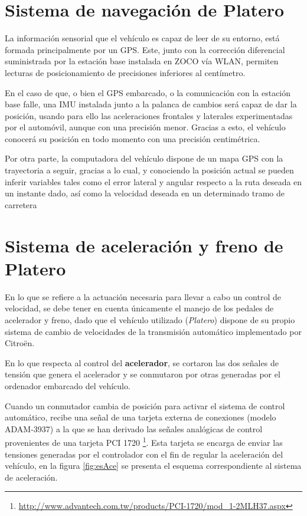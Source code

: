 \section{Sistema de navegación de Platero}
\label{ape:platero}

La información sensorial que el vehículo es capaz de leer de su entorno, está formada principalmente por un \gls{GPS}. Este, junto con la corrección diferencial suministrada por la estación base instalada en \gls{ZOCO} vía {WLAN}, permiten lecturas de posicionamiento de precisiones inferiores al centímetro.

En el caso de que, o bien el \gls{GPS} embarcado, o la comunicación con la estación base falle, una \gls{IMU} instalada junto a la palanca de cambios será capaz de dar la posición, usando para ello las aceleraciones frontales y laterales experimentadas por el automóvil, aunque con una precisión menor. Gracias a esto, el vehículo conocerá su posición en todo momento con una precisión centimétrica.

Por otra parte, la computadora del vehículo dispone de un mapa \gls{GPS} con la trayectoria a seguir, gracias a lo cual, y conociendo la posición actual se pueden inferir variables tales como el error lateral y angular respecto a la ruta deseada en un instante dado, así como la velocidad deseada en un determinado tramo de carretera     

\section{Sistema de aceleración y freno de Platero}
\label{ape:esquemas}


En lo que se refiere a la actuación necesaria para llevar a cabo un control de velocidad, se debe tener en cuenta únicamente el manejo de los pedales de acelerador y freno, dado que el vehículo utilizado (\textit{Platero}) dispone de su propio sistema de cambio de velocidades de la transmisión automático implementado por Citroën.

En lo que respecta al control del \textbf{acelerador}, se cortaron las dos señales de tensión que genera el acelerador y se conmutaron por otras generadas por el ordenador embarcado del vehículo.
 
Cuando un conmutador cambia de posición para activar el sistema de control automático, recibe una señal de una tarjeta externa de conexiones (modelo ADAM-3937) a la que se han derivado las señales analógicas de control provenientes de una tarjeta PCI 1720 \footnote{\url{ http://www.advantech.com.tw/products/PCI-1720/mod_1-2MLH37.aspx}}. Esta tarjeta se encarga de enviar las tensiones generadas por el controlador con el fin de regular la aceleración del vehículo, en la figura \ref{fig:esAce} se presenta el esquema correspondiente al sistema de aceleración.


